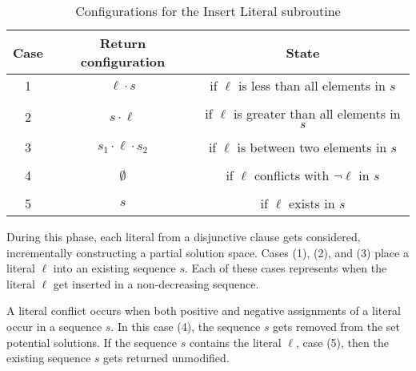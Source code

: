 \begin{table}[htdp]
\caption{Configurations for the {\sc Insert Literal} subroutine}
\begin{center}
\begin{tabular}{|c|c|c|}
\hline
\textbf{Case} & \textbf{Return configuration} & \textbf{State} \\ \hline 
1	& $\ell \cdot s$ & if $\ell$ is less than all elements in $s$ \\ 
& &  \\ \hline
2	& $s \cdot \ell$ & if $\ell$ is greater than all elements in $s$ \\ 
& &  \\ \hline
3	& $s_1 \cdot \ell \cdot s_2$ & if $\ell$ is between two elements in $s$ \\ 
& &  \\ \hline
4	& $\emptyset$ & if $\ell$ conflicts with $\neg \ell$ in $s$\\
& &  \\ \hline
5	& $s$ & if $\ell$ exists in $s$\\ \hline
\end{tabular}
\end{center}
\label{distributionInsertTable}
\end{table}%

\FloatBarrier

		
During this phase, each literal from a disjunctive clause gets considered, incrementally constructing a partial solution space.  Cases (1), (2), and (3) place a literal $\ell$ into an existing sequence $s$.  Each of these cases represents when the literal $\ell$ get inserted in a non-decreasing sequence.




A literal conflict occurs when both positive and negative assignments of a literal occur in a sequence $s$.  In this case (4), the sequence $s$ gets removed from the set potential solutions.  If the sequence $s$ contains the literal $\ell$, case (5), then the existing sequence $s$ gets returned unmodified.




